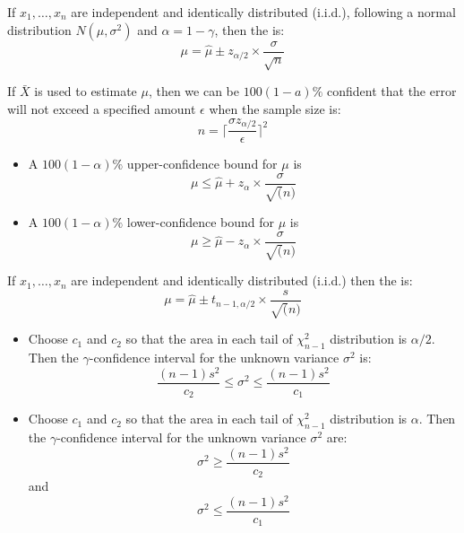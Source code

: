 \begin{multicols}{3}
    \par If $x_1, \ldots, x_n$ are independent and identically distributed (i.i.d.), following a normal distribution $N(\mu, \sigma^2)$ and $\alpha = 1 - \gamma$, then the  is:
    \[
      \mu = \hat{\mu} \pm z_{\alpha / 2} \times \frac{\sigma}{\sqrt{n}}
    \]

      \par If $\bar{X}$ is used to estimate $\mu$, then we can be $100(1 - a)\%$ confident that the error will not exceed a specified amount $\epsilon$ when the sample size is:
      \[
        n = \bigg\lceil \frac{\sigma z_{\alpha/2}}{\epsilon} \bigg\rceil^2
      \]

      \begin{itemize}
        \item A $100(1 - \alpha)\%$ upper-confidence bound for $\mu$ is
        \[
          \mu \leq \hat{\mu} + z_{\alpha} \times \frac{\sigma}{\sqrt(n)}
        \]
        \item A $100(1 - \alpha)\%$ lower-confidence bound for $\mu$ is
        \[
          \mu \geq \hat{\mu} - z_{\alpha} \times \frac{\sigma}{\sqrt(n)}
        \]
      \end{itemize}

     \par If $x_1, \ldots, x_n$ are independent and identically distributed (i.i.d.) then the  is:
     \[
      \mu = \hat{\mu} \pm t_{n - 1, \alpha / 2} \times \frac{s}{\sqrt(n)}
     \]
      \begin{itemize}
        \item {}
        \par Choose $c_1$ and $c_2$ so that the area in each tail of $\chi_{n - 1}^2$ distribution is $\alpha / 2$. Then the $\gamma$-confidence interval
        for the unknown variance $\sigma^2$ is:
        \[
          \frac{(n - 1)s^2}{c_2} \leq \sigma^2 \leq \frac{(n - 1)s^2}{c_1}
        \]
        \item {}
        \par Choose $c_1$ and $c_2$ so that the area in each tail of $\chi_{n - 1}^2$ distribution is $\alpha$. Then the $\gamma$-confidence interval
        for the unknown variance $\sigma^2$ are:
        \[
          \sigma^2 \geq \frac{(n - 1)s^2}{c_2}
        \]
        and
        \[
          \sigma^2 \leq \frac{(n - 1)s^2}{c_1}
        \]
      \end{itemize}


\end{multicols}
